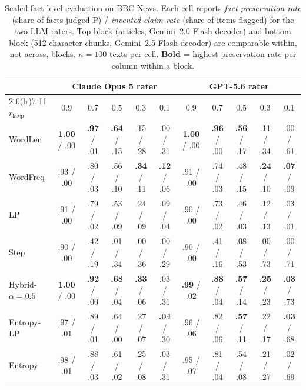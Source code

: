 \documentclass[11pt]{article}
\newcommand{\rkeep}{r_{\mathrm{keep}}}
\begin{document}
\begin{table}[tbp]
\centering
\small
\setlength{\tabcolsep}{3.5pt}
\caption{Scaled fact-level evaluation on BBC News. Each cell reports \emph{fact preservation rate} (share
of facts judged P) / \emph{invented-claim rate} (share of items flagged) for the two LLM raters. Top block
(articles, Gemini~2.0 Flash decoder) and bottom block (512-character chunks, Gemini~2.5 Flash decoder)
are comparable within, not across, blocks. $n{=}100$ texts per cell. \textbf{Bold} = highest preservation rate per column within a block.}
\label{tab:fact_eval}
\begin{tabular}{l ccccc ccccc}
\toprule
& \multicolumn{5}{c}{\textbf{Claude Opus 5 rater}} & \multicolumn{5}{c}{\textbf{GPT-5.6 rater}} \\
\cmidrule(lr){2-6}\cmidrule(lr){7-11}
$\rkeep$ & 0.9 & 0.7 & 0.5 & 0.3 & 0.1 & 0.9 & 0.7 & 0.5 & 0.3 & 0.1 \\
\midrule
WordLen  & \textbf{1.00} / .00 & \textbf{.97} / .01 & \textbf{.64} / .15 & .15 / .28 & .00 / .31 & \textbf{1.00} / .00 & \textbf{.96} / .00 & \textbf{.56} / .17 & .11 / .34 & .00 / .61 \\
WordFreq & .93 / .00 & .80 / .03 & .56 / .10 & \textbf{.34} / .11 & \textbf{.12} / .06 & .91 / .00 & .74 / .03 & .48 / .15 & \textbf{.24} / .10 & \textbf{.07} / .09 \\
LP       & .91 / .00 & .79 / .02 & .53 / .09 & .24 / .09 & .09 / .04 & .90 / .00 & .73 / .02 & .46 / .03 & .12 / .13 & .03 / .01 \\
Step     & .90 / .00 & .42 / .19 & .01 / .34 & .00 / .36 & .00 / .29 & .90 / .00 & .41 / .16 & .08 / .53 & .00 / .73 & .00 / .71 \\
\midrule
Hybrid-$\alpha{=}0.5$ & \textbf{1.00} / .00 & \textbf{.92} / .00 & \textbf{.68} / .04 & \textbf{.33} / .06 & .03 / .31 & \textbf{.99} / .02 & \textbf{.88} / .04 & \textbf{.57} / .14 & \textbf{.25} / .23 & \textbf{.03} / .73 \\
Entropy-LP & .97 / .01 & .89 / .01 & .64 / .00 & .27 / .07 & \textbf{.04} / .30 & .96 / .06 & .82 / .06 & \textbf{.57} / .11 & .22 / .17 & \textbf{.03} / .68 \\
Entropy    & .98 / .01 & .88 / .03 & .61 / .02 & .25 / .08 & .03 / .31 & .95 / .07 & .81 / .04 & .54 / .08 & .21 / .27 & .02 / .69 \\
\bottomrule
\end{tabular}
\end{table}
\end{document}
